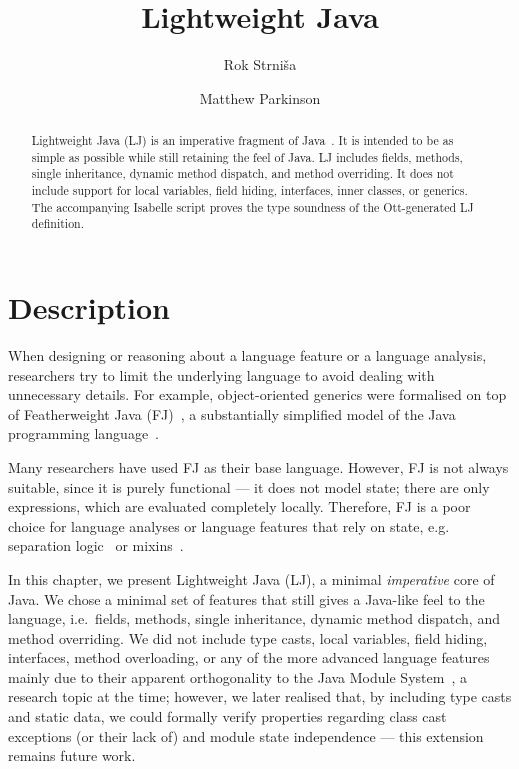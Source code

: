 \documentclass[11pt,a4paper]{article}
\newcommand{\ie}{i.e.~}
\newcommand{\eg}{e.g.~}
\begin{document}
\title{Lightweight Java}
\author{Rok Strni\v sa \and Matthew Parkinson}
\maketitle

\begin{abstract}
Lightweight Java (LJ) is an imperative fragment of Java~\cite{java}. It is
intended to be as simple as possible while still retaining the feel of Java. LJ
includes fields, methods, single inheritance, dynamic method dispatch, and
method overriding. It does not include support for local variables, field
hiding, interfaces, inner classes, or generics. The accompanying Isabelle
script proves the type soundness of the Ott-generated LJ definition.
\end{abstract}

\section{Description}

When designing or reasoning about a language feature or a language analysis,
researchers try to limit the underlying language to avoid dealing with
unnecessary details. For example, object-oriented generics were formalised on
top of Featherweight Java (FJ)~\cite{fj}, a substantially simplified model of
the Java programming language~\cite{java}.

Many researchers have used FJ as their base language. However, FJ is not always
suitable, since it is purely functional --- it does not model state; there are
only expressions, which are evaluated completely locally. Therefore, FJ is a
poor choice for language analyses or language features that rely on state, \eg
separation logic~\cite{sl} or mixins~\cite{mixins}.

In this chapter, we present Lightweight Java (LJ), a minimal {\em imperative}
core of Java. We chose a minimal set of features that still gives a Java-like
feel to the language, \ie fields, methods, single inheritance, dynamic method
dispatch, and method overriding. We did not include type casts, local
variables, field hiding, interfaces, method overloading, or any of the more
advanced language features mainly due to their apparent orthogonality to the
Java Module System~\cite{jsr277}, a research topic at the time; however, we
later realised that, by including type casts and static data, we could formally
verify properties regarding class cast exceptions (or their lack of) and module
state independence --- this extension remains future work.
\end{document}
